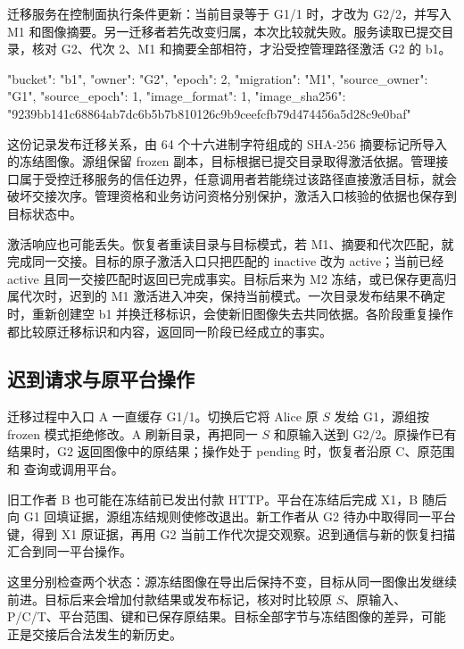 迁移服务在控制面执行条件更新：当前目录等于 G1/1 时，才改为 G2/2，并写入 M1 和图像摘要。另一迁移者若先改变归属，本次比较就失败。服务读取已提交目录，核对 G2、代次 2、M1 和摘要全部相符，才沿受控管理路径激活 G2 的 b1。

\begin{BookCode}
{
  "bucket": "b1",
  "owner": "G2",
  "epoch": 2,
  "migration": "M1",
  "source_owner": "G1",
  "source_epoch": 1,
  "image_format": 1,
  "image_sha256":
    "9239bb141c68864ab7dc6b5b7b810126c9b9ceefcfb79d474456a5d28c9e0baf"
}
\end{BookCode}

这份记录发布迁移关系，由 64 个十六进制字符组成的 SHA-256 摘要标记所导入的冻结图像。源组保留 frozen 副本，目标根据已提交目录取得激活依据。管理接口属于受控迁移服务的信任边界，任意调用者若能绕过该路径直接激活目标，就会破坏交接次序。管理资格和业务访问资格分别保护，激活入口核验的依据也保存到目标状态中。

激活响应也可能丢失。恢复者重读目录与目标模式，若 M1、摘要和代次匹配，就完成同一交接。目标的原子激活入口只把匹配的 inactive 改为 active；当前已经 active 且同一交接匹配时返回已完成事实。目标后来为 M2 冻结，或已保存更高归属代次时，迟到的 M1 激活进入冲突，保持当前模式。一次目录发布结果不确定时，重新创建空 b1 并换迁移标识，会使新旧图像失去共同依据。各阶段重复操作都比较原迁移标识和内容，返回同一阶段已经成立的事实。

\subsection*{迟到请求与原平台操作}

迁移过程中入口 A 一直缓存 G1/1。切换后它将 Alice 原 $S$ 发给 G1，源组按 frozen 模式拒绝修改。A 刷新目录，再把同一 $S$ 和原输入送到 G2/2。原操作已有结果时，G2 返回图像中的原结果；操作处于 pending 时，恢复者沿原 C、原范围和  查询或调用平台。

旧工作者 B 也可能在冻结前已发出付款 HTTP。平台在冻结后完成 X1，B 随后向 G1 回填证据，源组冻结规则使修改退出。新工作者从 G2 待办中取得同一平台键，得到 X1 原证据，再用 G2 当前工作代次提交观察。迟到通信与新的恢复扫描汇合到同一平台操作。


这里分别检查两个状态：源冻结图像在导出后保持不变，目标从同一图像出发继续前进。目标后来会增加付款结果或发布标记，核对时比较原 $S$、原输入、P/C/T、平台范围、键和已保存原结果。目标全部字节与冻结图像的差异，可能正是交接后合法发生的新历史。

